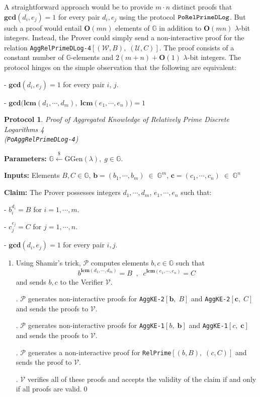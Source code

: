 \documentclass[11pt, lettersize, notitlepage, leqno, footskip=0.6cm]{article}
\newcommand{\mc}{\mathcal}
\newcommand{\mb}{\mathbb}
\newcommand{\mbf}{\mathbf}
\newcommand{\mr}{\mathrm}
\newcommand{\lamb}{\lambda}
\newcommand{\bO}{\mbf{O}}
\newcommand{\mP}{\mc{P}}
\newcommand{\vs}{\vspace{-0.15cm}}
\newcommand{\noin}{\noindent}
\newcommand{\LCM}{\mbf{lcm}}
\newcommand{\GCD}{\mbf{gcd}}
\newtheorem{Prot}[Thm]{Protocol}
\numberwithin{equation}{section}
\begin{document}
A straightforward approach would be to provide $m\cdot n$ distinct proofs that $\GCD(d_i, e_j) = 1$ for every pair $d_i,e_j$ using the protocol $\tt{PoRelPrimeDLog}$. But such a proof would entail $\mbf{O}(mn)$ elements of $\mb{G}$ in addition to $\mbf{O}(mn)$ $\lamb$-bit integers. Instead, the Prover could simply send a non-interactive proof for the relation \verb|AggRelPrimeDLog-4|$[(\mc{W}, B),\;(\mc{U}, C)]$. The proof consists of a constant number of $\mb{G}$-elements and $2(m+n)+\bO(1)$ $\lamb$-bit integers. The protocol hinges on the simple observation that the following are equivalent: \vspace{0.1cm}

\noin - $\GCD(d_i,e_j) = 1$ for every pair $i$, $j$.

\noin - $\GCD\big(\LCM(d_1,\cdots,d_m),\; \LCM(e_1,\cdots, e_n)\big) = 1$

\vspace{0.2cm} 


\begin{Prot} \normalfont \hypertarget{RP4}{\textit{Proof of Aggregated Knowledge of Relatively Prime Discrete Logarithms} 4}\\ (\verb|PoAggRelPrimeDLog-4|)\end{Prot}\vspace{-0.3cm}

\noindent \textbf{Parameters:} $\mb{G}\xleftarrow{\$} \mr{GGen}(\lamb), \; g\in \mb{G}$.

\noindent \textbf{Inputs:} Elements $B, C\in \mb{G}$,\;  $\mbf{b} = (b_1,\cdots, b_m)\;\in\;\mb{G}^m$,\;\; $\mbf{c} = (c_1,\cdots, c_n)\;\in\;\mb{G}^n$

\noindent \textbf{Claim:} The Prover possesses integers $ d_1,\cdots, d_m$,\; $e_1,\cdots,e_n$ such that:

\noindent - $b_i^{d_i} = B$ for $i = 1,\cdots, m$.

\noindent - $c_j^{e_j} = C$ for $j = 1,\cdots, n$.

\noindent - $\GCD(d_i, e_j) = 1$ for every pair $i, j$.

\begin{enumerate}[wide, labelwidth=!, labelindent=0pt]\vs \item Using Shamir's trick, $\mP$ computes elements $b, c \in \mb{G}$ such that $$b^{\LCM(d_1,\cdots,d_m)} = B\;\; , \;\; c^{\LCM(e_1,\cdots,e_n)} = C$$ and sends $b,c$ to the Verifier $\mc{V}$.

. $\mc{P}$ generates non-interactive proofs for \verb|AggKE-2|$[\mbf{b},\; B]$ and \verb|AggKE-2|$[\mbf{c},\; C]$ and sends the proofs to $\mc{V}$.

. $\mc{P}$ generates non-interactive proofs for \verb|AggKE-1|$[b,\;\mbf{b}]$ and \verb|AggKE-1|$[c,\; \mbf{c}]$ and sends the proofs to $\mc{V}$.

. $\mc{P}$ generates a non-interactive proof for \verb|RelPrime|$[(b,B),\;(c,C)]$ and sends the proof to $\mc{V}$.

. $\mc{V}$ verifies all of these proofs and accepts the validity of the claim if and only if all proofs are valid.\qed \end{enumerate}
\end{document}
